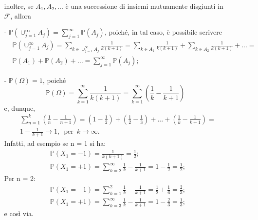 \documentclass[12pt]{homework}
\begin{document}
\begin{enumerate}
\begin{itemize}
  inoltre, se $A_{1},A_{2},...$ è una successione di insiemi mutuamente disgiunti in $\mathcal{F}$, allora 
  \item[-]
  $\mathbb{P}\left(\cup_{j=1}^{\infty}A_{j}\right)=\sum_{j=1}^{\infty}\mathbb{P}\left(A_{j}\right)$, poiché, in tal caso, è possibile scrivere
  \begin{align*}
  &\mathbb{P}\left(\cup_{j=1}^{\infty}A_{j}\right)=\sum_{k\in\cup_{j=1}^{\infty}A_{j}}\frac{1}{k\left(k+1\right)}=\sum_{k\in A_{1}}\frac{1}{k\left(k+1\right)}+\sum_{k\in A_{2}}\frac{1}{k\left(k+1\right)}+...=\\
  &\mathbb{P}\left(A_{1}\right)+\mathbb{P}\left(A_{2}\right)+...=\sum_{j=1}^{\infty}\mathbb{P}\left(A_{j}\right);
\end{align*}   
\item[-]
$\mathbb{P}\left(\Omega\right)=1$, poiché
\begin{equation*}
\mathbb{P}\left(\Omega\right)=\sum_{k=1}^{\infty}\frac{1}{k\left(k+1\right)}=\sum_{k=1}^{\infty}\left(\frac{1}{k}-\frac{1}{k+1}\right)
\end{equation*}
e, dunque,
\begin{align*}
&\sum_{n=1}^{k}\left(\frac{1}{n}-\frac{1}{n+1}\right)=\left(1-\frac{1}{2}\right)+\left(\frac{1}{2}-\frac{1}{3}\right)+...+\left(\frac{1}{k}-\frac{1}{k+1}\right)=\\
&1-\frac{1}{k+1}\longrightarrow 1, \,\,\, \text{per}\,\,\, k\rightarrow \infty.
\end{align*}
Infatti, ad esempio se n = 1 si ha:
\begin{align*}
&\mathbb{P}\left(X_1 = -1\right) = \frac{1}{k\left(k+1\right)}= \frac{1}{2}; \\
&\mathbb{P}\left(X_1 = +1\right) = \sum_{k=2}^{\infty}\frac{1}{k}-\frac{1}{k+1} = 1-\frac{1}{2} = \frac{1}{2};
\end{align*}
Per n = 2: 
\begin{align*}
&\mathbb{P}\left(X_1 = -1\right) =  \sum_{k=1}^{2}\frac{1}{k} - \frac{1}{k+1} = \frac{1}{2} + \frac{1}{6} = \frac{2}{3};\\
&\mathbb{P}\left(X_1 = +1\right) = \sum_{k=3}^{\infty}\frac{1}{k}-\frac{1}{k+1} = 1-\frac{2}{3} = \frac{1}{3};
\end{align*}
e così via. 
\end{itemize}
 

\end{enumerate}
\end{document}
